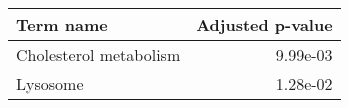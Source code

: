 \begin{tabular}{lr}
\toprule
             Term name &  Adjusted p-value \\
\midrule
Cholesterol metabolism &          9.99e-03 \\
              Lysosome &          1.28e-02 \\
\bottomrule
\end{tabular}
